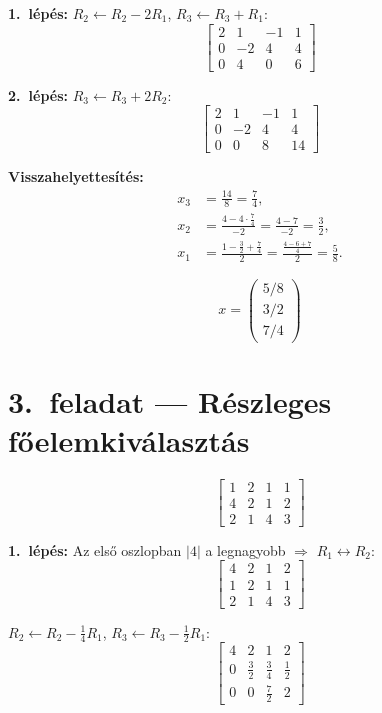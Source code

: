 \documentclass[a4paper,12pt]{article}
\begin{document}
\textbf{1.\ lépés:} $R_2 \leftarrow R_2 - 2R_1$, \; $R_3 \leftarrow R_3 + R_1$:
\[
\left[\begin{array}{ccc|c}
2 & 1 & -1 & 1 \\
0 & -2 & 4 & 4 \\
0 & 4 & 0 & 6
\end{array}\right]
\]

\textbf{2.\ lépés:} $R_3 \leftarrow R_3 + 2R_2$:
\[
\left[\begin{array}{ccc|c}
2 & 1 & -1 & 1 \\
0 & -2 & 4 & 4 \\
0 & 0 & 8 & 14
\end{array}\right]
\]

\textbf{Visszahelyettesítés:}
\begin{align}
x_3 &= \frac{14}{8} = \frac{7}{4}, \\[4pt]
x_2 &= \frac{4 - 4\cdot\frac{7}{4}}{-2} = \frac{4-7}{-2} = \frac{3}{2}, \\[4pt]
x_1 &= \frac{1 - \frac{3}{2} + \frac{7}{4}}{2} = \frac{\frac{4-6+7}{4}}{2} = \frac{5}{8}.
\end{align}

\[
\boxed{x = \begin{pmatrix} 5/8 \\ 3/2 \\ 7/4 \end{pmatrix}}
\]

\section*{3.\ feladat --- Részleges főelemkiválasztás}

\[
\left[\begin{array}{ccc|c}
1 & 2 & 1 & 1 \\
4 & 2 & 1 & 2 \\
2 & 1 & 4 & 3
\end{array}\right]
\]

\textbf{1.\ lépés:} Az első oszlopban $|4|$ a legnagyobb $\Rightarrow$ $R_1 \leftrightarrow R_2$:
\[
\left[\begin{array}{ccc|c}
4 & 2 & 1 & 2 \\
1 & 2 & 1 & 1 \\
2 & 1 & 4 & 3
\end{array}\right]
\]

$R_2 \leftarrow R_2 - \tfrac{1}{4}R_1$, \; $R_3 \leftarrow R_3 - \tfrac{1}{2}R_1$:
\[
\left[\begin{array}{ccc|c}
4 & 2 & 1 & 2 \\[2pt]
0 & \frac{3}{2} & \frac{3}{4} & \frac{1}{2} \\[2pt]
0 & 0 & \frac{7}{2} & 2
\end{array}\right]
\]
\end{document}
